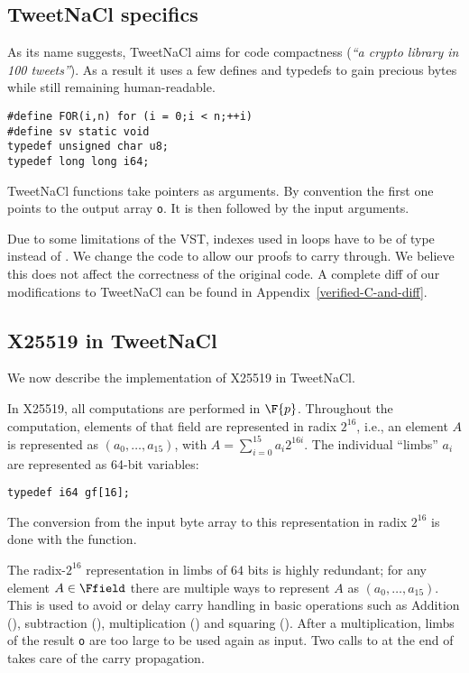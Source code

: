 \subsection{TweetNaCl specifics}
\label{subsec:Number-TweetNaCl}

As its name suggests, TweetNaCl aims for code compactness (\emph{``a crypto library in 100 tweets''}).
As a result it uses a few defines and typedefs to gain precious bytes while
still remaining human-readable.
\begin{lstlisting}[language=Ctweetnacl,stepnumber=0]
#define FOR(i,n) for (i = 0;i < n;++i)
#define sv static void
typedef unsigned char u8;
typedef long long i64;
\end{lstlisting}

TweetNaCl functions take pointers as arguments. By convention the first one
points to the output array \texttt{o}. It is then followed by the input arguments.

Due to some limitations of the VST, indexes used in  loops have to be
of type  instead of . We change the code to allow our
proofs to carry through. We believe this does not affect the correctness of the
original code. A complete diff of our modifications to TweetNaCl can be found in
Appendix~\ref{verified-C-and-diff}.


\subsection{X25519 in TweetNaCl}
\label{subsec:X25519-TweetNaCl}

We now describe the implementation of X25519 in TweetNaCl.

In X25519, all computations are performed in $\F{p}$.
Throughout the computation, elements of that field
are represented in radix $2^{16}$,
i.e., an element $A$ is represented as $(a_0,\dots,a_{15})$,
with $A = \sum_{i=0}^{15}a_i2^{16i}$.
The individual ``limbs'' $a_i$ are represented as
64-bit  variables:
\begin{lstlisting}[language=Ctweetnacl,stepnumber=0]
typedef i64 gf[16];
\end{lstlisting}

The conversion from the input byte array to this representation in radix
$2^{16}$ is done with the  function.

The radix-$2^{16}$ representation in limbs of $64$ bits is
highly redundant; for any element $A \in \Ffield$ there are
multiple ways to represent $A$ as $(a_0,\dots,a_{15})$.
This is used to avoid or delay carry handling in basic operations such as
Addition (), subtraction (), multiplication ()
and squaring (). After a multiplication, limbs of the result
\texttt{o} are too large to be used again as input. Two calls to
 at the end of  takes care of the carry propagation.

